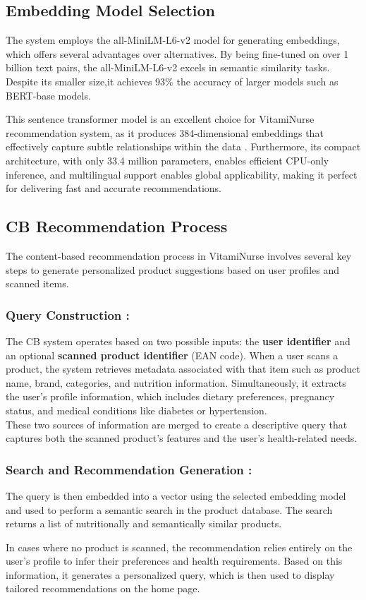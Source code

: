 \subsection{Embedding Model Selection}
\par The system employs the all-MiniLM-L6-v2 model for generating embeddings, which offers several advantages over alternatives. 
By being fine-tuned on over 1 billion text pairs, the all-MiniLM-L6-v2 excels in semantic similarity tasks. 
Despite its smaller size,it achieves 93\% the accuracy of larger models such as BERT-base models. 

\par This sentence transformer model is an excellent choice for VitamiNurse recommendation system, as it produces 384-dimensional embeddings that effectively capture subtle relationships within the data \cite{allMiniLML12}. Furthermore, its compact architecture, with only 33.4 million parameters, enables
efficient CPU-only inference, and multilingual support enables global applicability, making it
perfect for delivering fast and accurate recommendations.


\subsection{CB Recommendation Process}
 The content-based recommendation process in VitamiNurse involves several key steps to generate personalized product suggestions based on user profiles and scanned items.
\subsubsection{Query Construction :}
\par The CB system operates based on two possible inputs: the \textbf{user identifier} and an optional \textbf{scanned product identifier} (EAN code). When a user scans a product, the system retrieves metadata associated with that item such as product name, brand, categories, and nutrition information. Simultaneously, it extracts the user’s profile information, which includes dietary preferences, pregnancy status, and medical conditions like diabetes or hypertension.\\
These two sources of information are merged to create a descriptive query that captures both the scanned product’s features and the user's health-related needs. 

\subsubsection{Search and Recommendation Generation :}
The query is then embedded into a vector using the selected embedding model and used to perform a semantic search in the product database. The search returns a list of nutritionally and semantically similar products.
\par In cases where no product is scanned, the recommendation relies entirely on the user’s profile to infer their preferences and health requirements. Based on this information, it generates a personalized query, which is then used to display tailored recommendations on the home page.


